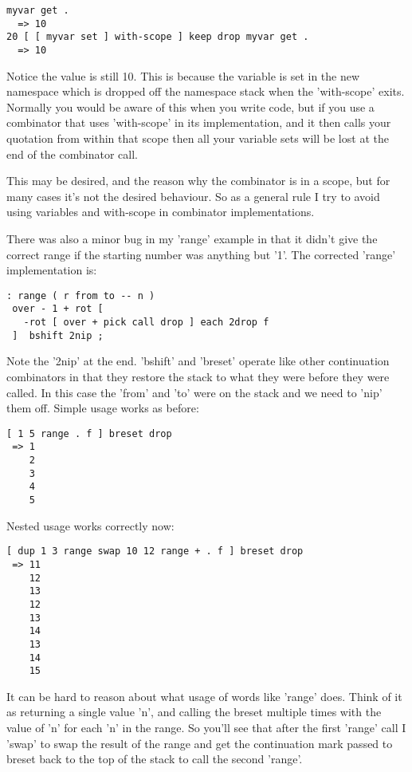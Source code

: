\begin{verbatim}
myvar get .
  => 10
20 [ [ myvar set ] with-scope ] keep drop myvar get .
  => 10
\end{verbatim}


Notice the value is still 10. This is because the variable is set in
the new namespace which is dropped off the namespace stack when the
'with-scope' exits. Normally you would be aware of this when you write
code, but if you use a combinator that uses 'with-scope' in its
implementation, and it then calls your quotation from within that
scope then all your variable sets will be lost at the end of the
combinator call.

This may be desired, and the reason why the combinator is in a scope,
but for many cases it's not the desired behaviour. So as a general
rule I try to avoid using variables and with-scope in combinator
implementations.

There was also a minor bug in my 'range' example in that it didn't
give the correct range if the starting number was anything but
'1'. The corrected 'range' implementation is:


\begin{verbatim}
: range ( r from to -- n )
 over - 1 + rot [ 
   -rot [ over + pick call drop ] each 2drop f  
 ]  bshift 2nip ;
\end{verbatim}


Note the '2nip' at the end. 'bshift' and 'breset' operate like other
continuation combinators in that they restore the stack to what they
were before they were called. In this case the 'from' and 'to' were on
the stack and we need to 'nip' them off. Simple usage works as before:


\begin{verbatim}
[ 1 5 range . f ] breset drop
 => 1
    2
    3
    4
    5
\end{verbatim}


Nested usage works correctly now:


\begin{verbatim}
[ dup 1 3 range swap 10 12 range + . f ] breset drop
 => 11
    12
    13
    12
    13
    14
    13
    14
    15
\end{verbatim}


It can be hard to reason about what usage of words like 'range'
does. Think of it as returning a single value 'n', and calling the
breset multiple times with the value of 'n' for each 'n' in the
range. So you'll see that after the first 'range' call I 'swap' to
swap the result of the range and get the continuation mark passed to
breset back to the top of the stack to call the second 'range'.

